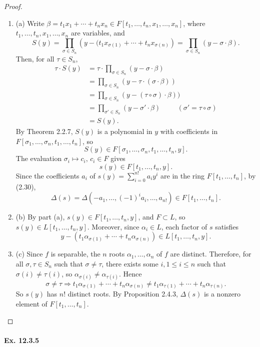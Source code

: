 \documentclass[11pt,a4paper]{article}
\newcommand{\be} {\begin{enumerate}}
\newcommand{\ee} {\end{enumerate}}
\begin{document}
\begin{proof}
\be
\item[(a)] Write $\beta = t_1x_1+\cdots + t_nx_n  \in F[t_1,\ldots,t_n,x_1,\ldots,x_n]$, where $t_1,\ldots,t_n,x_1,\ldots,x_n$ are variables, and
$$S(y) = \prod_{\sigma \in S_n} \left(y - (t_1 x_{\sigma(1)} + \cdots+t_n x_{\sigma(n)}\right ) = \prod_{\sigma \in S_n} (y - \sigma \cdot \beta).$$
Then, for all $\tau \in S_n$,
\begin{align*}
\tau \cdot S(y)  &= \tau \cdot \prod_{\sigma \in S_n} (y - \sigma \cdot \beta)\\
&= \prod_{\sigma \in S_n} (y - \tau \cdot (\sigma \cdot \beta))\\
&=  \prod_{\sigma \in S_n} (y - (\tau \circ \sigma) \cdot \beta))\\
&= \prod_{\sigma' \in S_n} (y - \sigma' \cdot \beta) \hspace{1cm} (\sigma' = \tau \circ \sigma)\\
&= S(y).
\end{align*}
By Theorem 2.2.7, $S(y)$ is a polynomial in $y$ with coefficients in $F[\sigma_1,\ldots,\sigma_n,t_1,\ldots,t_n]$, so
$$S(y) \in F[\sigma_1,\ldots,\sigma_n,t_1,\ldots,t_n,y].$$
The evaluation $\sigma_i \mapsto c_i,\, c_i \in F $ gives
$$s(y) \in F[t_1,\ldots,t_n,y].$$
Since the coefficients $a_i$ of $s(y)= \sum_{i =0}^{n!} a_i y^i $ are in the ring $F[t_1,\ldots, t_n]$, by (2.30),
$$\Delta(s) = \Delta(-a_1,\ldots,(-1)^i a_i,\ldots,a_{n!}) \in F[t_1,\ldots, t_n].$$

\item[(b)] By part (a), $s(y) \in F[t_1,\ldots,t_n,y]$, and $F \subset L$, so $s(y) \in L[t_1,\ldots,t_n,y]$. Moreover, since $\alpha_i \in L$, each factor of $s$ satisfies 
$$y- (t_1\alpha_{\sigma(1)} + \cdots + t_n \alpha_{\sigma(n)}) \in  L[t_1,\ldots,t_n,y].$$

\item[(c)] Since $f$ is separable, the $n$ roots $\alpha_1,\ldots,\alpha_n$ of $f$ are distinct. Therefore, for all $\sigma,\tau \in S_n$ such that $\sigma \ne \tau$, there exists some $i, 1 \leq i \leq n$ such that $\sigma(i) \ne \tau(i)$, so $\alpha_{\sigma(i)} \ne \alpha_{\tau(i)}$. Hence
$$\sigma \ne \tau \Rightarrow t_1\alpha_{\sigma(1)} + \cdots + t_n \alpha_{\sigma(n)} \ne t_1\alpha_{\tau(1)} + \cdots + t_n \alpha_{\tau(n)}.$$
So $s(y)$ has $n!$ distinct roots. By Proposition 2.4.3, $\Delta(s)$ is a nonzero element of $F[t_1,\ldots,t_n]$.
\ee
\end{proof}

\paragraph{Ex. 12.3.5}
\end{document}
